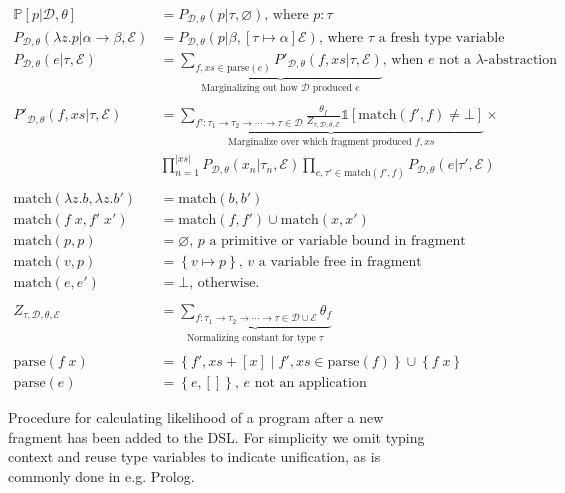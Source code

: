 \documentclass{article}
\newcommand{\indicator}{\mathds{1}} %
\newcommand{\probability}{\mathds{P}} %
\begin{document}
\begin{figure}
  \toprule \begin{minipage}[c]{\textwidth}
    \begin{align*}
      \probability[p|\mathcal{D},\theta]& = P_{\mathcal{D},\theta} (p|\tau,\varnothing )\text{, where $p:\tau$}\\
      P_{\mathcal{D},\theta} (\lambda z.p|\alpha\to\beta,\mathcal{E})& =
      P_{\mathcal{D},\theta}(p|\beta,[\tau\mapsto\alpha]\mathcal{E})\text{, where $\tau$ a fresh type variable}\\
      P_{\mathcal{D},\theta}(e|\tau,\mathcal{E})& = \underbrace{\sum_{f,xs\in \text{parse}(e)} P'_{\mathcal{D},\theta}(f,xs|\tau,\mathcal{E})}_{\text{Marginalizing out how $\mathcal{D}$ produced $e$}}\text{, when $e$ not a $\lambda$-abstraction}\\
      \\
      P'_{\mathcal{D},\theta}(f,xs|\tau,\mathcal{E})& = \underbrace{\sum_{f':\tau_1\to\tau_2\to\cdots\to\tau\in \mathcal{D}}\frac{\theta_f}{Z_{\tau,\mathcal{D},\theta,\mathcal{E}}}
        \indicator[\text{match}(f',f)\not=\bot]}_{\text{Marginalize over which fragment produced $f,xs$}}\times\\&\prod_{n=1}^{|xs|}P_{\mathcal{D},\theta}(x_n|\tau_n,\mathcal{E})\prod_{e,\tau'\in \text{match}(f',f)}P_{\mathcal{D},\theta}(e|\tau',\mathcal{E})\\
      \\
      \text{match}(\lambda z.b,\lambda z.b')& = \text{match}(b,b')\\
      \text{match}(f\;x,f'\;x')& = \text{match}(f,f')\cup\text{match}(x,x')\\
      \text{match}(p,p)& = \varnothing \text{, $p$ a primitive or variable bound in fragment}\\
      \text{match}(v,p)& = \left\{v\mapsto p   \right\} \text{, $v$ a variable free in fragment}\\
      \text{match}(e,e')& = \bot\text{, otherwise.}
      \\
      \\
      Z_{\tau,\mathcal{D},\theta,\mathcal{E}}& = \underbrace{\sum_{f:\tau_1\to\tau_2\to\cdots\to\tau\in \mathcal{D}\cup\mathcal{E}}\theta_f}_{\text{Normalizing constant for type $\tau$}}\\\\
      \text{parse}(f\;x)& = \left\{f',xs+[x] \;|\; f',xs\in \text{parse}(f) \right\}\cup\left\{f\;x \right\}\\
      \text{parse}(e)& = \left\{e,[] \right\} \text{, $e$ not an application}
    \end{align*}
  \end{minipage}
  \bottomrule
  \caption{Procedure for calculating likelihood of a program after a new fragment has been added to the DSL. For simplicity we omit typing context and reuse type variables to indicate unification, as is commonly done in e.g. Prolog.}\label{match}
  \end{figure}
\end{document}
